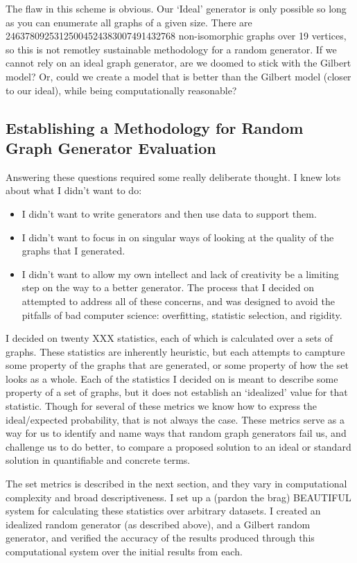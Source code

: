 \documentclass[11pt,a4paper]{report}
\begin{document}
The flaw in this scheme is obvious.
Our `Ideal' generator is only possible so long as you can enumerate all graphs of a given size.
There are 24637809253125004524383007491432768 non-isomorphic graphs over 19 vertices, so this is not remotley sustainable methodology for a random generator.
If we cannot rely on an ideal graph generator, are we doomed to stick with the Gilbert model?
Or, could we create a model that is better than the Gilbert model (closer to our ideal), while being computationally reasonable?

\subsection{Establishing a Methodology for Random Graph Generator Evaluation}

Answering these questions required some really deliberate thought.
I knew lots about what I didn't want to do:
\begin{itemize}
\item{I didn't want to write generators and then use data to support them.}
\item{I didn't want to focus in on singular ways of looking at the quality of the graphs that I generated.}
\item{I didn't want to allow my own intellect and lack of creativity be a limiting step on the way to a better generator.}
The process that I decided on attempted to address all of these concerns, and was designed to avoid the pitfalls of bad computer science: overfitting, statistic selection, and rigidity.
\end{itemize}

I decided on twenty XXX statistics, each of which is calculated over a sets of graphs.
These statistics are inherently heuristic, but each attempts to campture some property of the graphs that are generated, or some property of how the set looks as a whole.
Each of the statistics I decided on is meant to describe some property of a set of graphs, but it does not establish an `idealized' value for that statistic.
Though for several of these metrics we know how to express the ideal/expected probability, that is not always the case.
These metrics serve as a way for us to identify and name ways that random graph generators fail us, and challenge us to do better, to compare a proposed solution to an ideal or standard solution in quantifiable and concrete terms.

The set metrics is described in the next section, and they vary in computational complexity and broad descriptiveness.
I set up a (pardon the brag) BEAUTIFUL system for calculating these statistics over arbitrary datasets.
I created an idealized random generator (as described above), and a Gilbert random generator, and verified the accuracy of the results produced through this computational system over the initial results from each.
\end{document}
